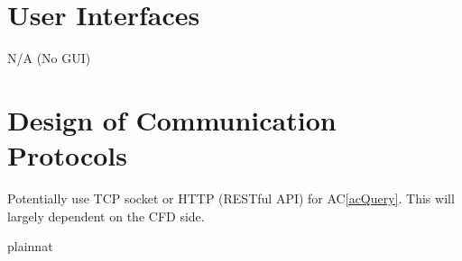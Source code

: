 \documentclass[12pt, titlepage]{article}
\newcommand{\acref}[1]{AC\ref{#1}}
\begin{document}

\section{User Interfaces}
N/A (No GUI)

\section{Design of Communication Protocols}
Potentially use TCP socket or HTTP (RESTful API) for \acref{acQuery}. This will largely dependent on the CFD side.





 {plainnat}


\newpage{}
\end{document}
